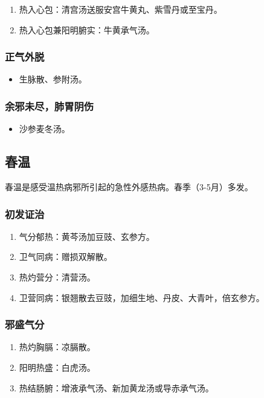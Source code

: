 \documentclass[cn,black,12pt,founder,normal,twocolumn]{elegantnote}
\begin{document}
\begin{enumerate}
    \item 热入心包：清宫汤送服安宫牛黄丸、紫雪丹或至宝丹。
    \item 热入心包兼阳明腑实：牛黄承气汤。
\end{enumerate}

\subsubsection{正气外脱}

\begin{itemize}
    \item 生脉散、参附汤。
\end{itemize}

\subsubsection{余邪未尽，肺胃阴伤}

\begin{itemize}
    \item 沙参麦冬汤。
\end{itemize}

\subsection{春温}

春温是感受温热病邪所引起的急性外感热病。春季（3-5月）多发。

\subsubsection{初发证治}

\begin{enumerate}
    \item 气分郁热：黄芩汤加豆豉、玄参方。
    \item 卫气同病：赠损双解散。
    \item 热灼营分：清营汤。
    \item 卫营同病：银翘散去豆豉，加细生地、丹皮、大青叶，倍玄参方。
\end{enumerate}

\subsubsection{邪盛气分}

\begin{enumerate}
    \item 热灼胸膈：凉膈散。
    \item 阳明热盛：白虎汤。
    \item 热结肠腑：增液承气汤、新加黄龙汤或导赤承气汤。
\end{enumerate}
\end{document}
